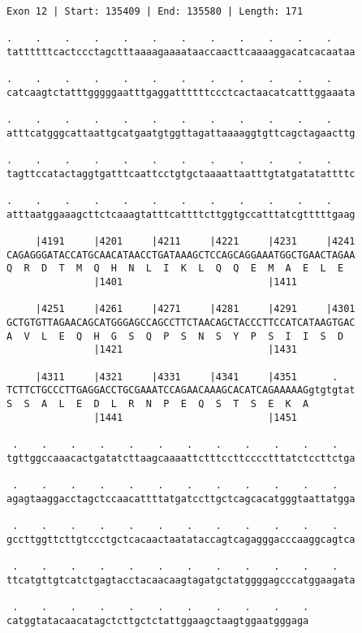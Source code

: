 \documentclass{article}
\begin{document}
\newpage
\begin{Verbatim}[fontfamily=courier]
Exon 12 | Start: 135409 | End: 135580 | Length: 171

.    .    .    .    .    .    .    .    .    .    .    .    
tattttttcactccctagctttaaaagaaaataaccaacttcaaaaggacatcacaataa

.    .    .    .    .    .    .    .    .    .    .    .    
catcaagtctatttgggggaatttgaggattttttccctcactaacatcatttggaaata

.    .    .    .    .    .    .    .    .    .    .    .    
atttcatgggcattaattgcatgaatgtggttagattaaaaggtgttcagctagaacttg

.    .    .    .    .    .    .    .    .    .    .    .    
tagttccatactaggtgatttcaattcctgtgctaaaattaatttgtatgatatattttc

.    .    .    .    .    .    .    .    .    .    .    .    
atttaatggaaagcttctcaaagtatttcattttcttggtgccatttatcgtttttgaag

     |4191     |4201     |4211     |4221     |4231     |4241
CAGAGGGATACCATGCAACATAACCTGATAAAGCTCCAGCAGGAAATGGCTGAACTAGAA
Q  R  D  T  M  Q  H  N  L  I  K  L  Q  Q  E  M  A  E  L  E  
               |1401                         |1411          

     |4251     |4261     |4271     |4281     |4291     |4301
GCTGTGTTAGAACAGCATGGGAGCCAGCCTTCTAACAGCTACCCTTCCATCATAAGTGAC
A  V  L  E  Q  H  G  S  Q  P  S  N  S  Y  P  S  I  I  S  D  
               |1421                         |1431          

     |4311     |4321     |4331     |4341     |4351      .   
TCTTCTGCCCTTGAGGACCTGCGAAATCCAGAACAAAGCACATCAGAAAAAGgtgtgtat
S  S  A  L  E  D  L  R  N  P  E  Q  S  T  S  E  K  A        
               |1441                         |1451          

 .    .    .    .    .    .    .    .    .    .    .    .   
tgttggccaaacactgatatcttaagcaaaattctttccttcccctttatctccttctga

 .    .    .    .    .    .    .    .    .    .    .    .   
agagtaaggacctagctccaacattttatgatccttgctcagcacatgggtaattatgga

 .    .    .    .    .    .    .    .    .    .    .    .   
gccttggttcttgtccctgctcacaactaatataccagtcagagggacccaaggcagtca

 .    .    .    .    .    .    .    .    .    .    .    .   
ttcatgttgtcatctgagtacctacaacaagtagatgctatggggagcccatggaagata

 .    .    .    .    .    .    .    .    .    .    .
catggtatacaacatagctcttgctctattggaagctaagtggaatgggaga
\end{Verbatim}
\end{document}
